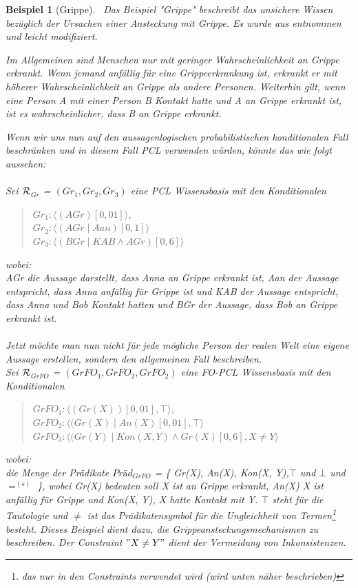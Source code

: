 \documentclass[a4paper, 11pt]{book}
\newtheorem{Bsp}{Beispiel}[section]
\begin{document}
\begin{Bsp}[Grippe]\label{sec:Bsp1}\
Das Beispiel "{}Grippe"{} beschreibt das unsichere Wissen bezüglich der Ursachen einer Ansteckung mit Grippe. Es wurde aus \cite[Bsp. 6.2.7, S. 128/129]{Fis10} entnommen und leicht modifiziert.

Im Allgemeinen sind Menschen nur mit geringer Wahrscheinlichkeit an Grippe erkrankt. Wenn jemand anfällig für eine Grippeerkrankung ist, erkrankt er mit höherer Wahrscheinlichkeit an Grippe als andere Personen. Weiterhin gilt, wenn eine Person A mit einer Person B Kontakt hatte und A an Grippe erkrankt ist, ist es wahrscheinlicher, dass B an Grippe erkrankt. 

Wenn wir uns nun auf den aussagenlogischen probabilistischen konditionalen Fall beschränken und in diesem Fall PCL  verwenden würden, könnte das wie folgt aussehen:\\
\\
Sei $ \cal{R} $$_{Gr}  $ = $ (Gr_{1}, Gr_{2}, Gr_{3})  $ eine PCL Wissensbasis mit den Konditionalen 
\begin{quote}
$ Gr_{1}  :  \langle (AGr)[0,01]\rangle $,\\
$ Gr_{2} : \langle (AGr \mid Aan)[0,1]\rangle$\\
$ Gr_{3} : \langle (BGr \mid KAB \wedge AGr )[0,6]\rangle$\\
\end{quote}
wobei:\\
AGr die Aussage darstellt, dass Anna an Grippe erkrankt ist, Aan der Aussage entspricht, dass Anna anfällig für Grippe ist und KAB der Aussage entspricht, dass Anna und Bob Kontakt hatten und BGr der Aussage, dass Bob an Grippe erkrankt ist. 
\\
\\
Jetzt möchte man nun nicht für jede mögliche Person der realen Welt eine eigene Aussage erstellen, sondern den allgemeinen Fall beschreiben.
\\
Sei $ \cal{R} $$_{GrFO} $ = $ (GrFO_{1}, GrFO_{2}, GrFO_{2})  $ eine FO-PCL Wissensbasis mit den Konditionalen 
\begin{quote}
$ GrFO_{1}  :  \langle (Gr(X))[0,01], \top \rangle $,\\
$ GrFO_{2} : \langle (Gr(X) \mid An(X)[0,01], \top \rangle$\\
$ GrFO_{3} : \langle (Gr(Y) \mid Kon(X, Y) \wedge Gr(X )[0,6], X \neq Y \rangle$\\
\end{quote}
wobei:\\
die Menge der Prädikate $Präd_{GrFO}$  = \{ Gr(X), An(X), Kon(X, Y),$ \top $    und $ \bot  $ und $ =^{(s)}$ \}, wobei Gr(X) bedeuten soll X ist an Grippe erkrankt, An(X) X ist anfällig für Grippe und Kon(X, Y),  X hatte Kontakt mit Y. $ \top $ steht für die Tautologie und $ \neq  $ ist das Prädikatensymbol für die Ungleichheit von Termen\footnote{das nur in den Constraints verwendet wird (wird unten näher beschrieben)} besteht. Dieses Beispiel dient dazu, die Grippeansteckungsmechanismen zu beschreiben. Der Constraint $  "{} X \neq Y "{} $ dient der Vermeidung von Inkonsistenzen.


\end{Bsp}
\end{document}
